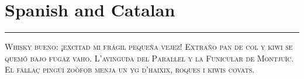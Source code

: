 

\vspace{-1em}\section*{\checkyes Spanish and Catalan}
\vspace{-.5em}\hrule\vspace{.5em}
\noindent\textsc{
Whisky bueno: ¡excitad mi frágil pequeña vejez!
Extraño pan de col y kiwi se quemó bajo fugaz vaho. 
L'avinguda del Paraŀlel y la Funicular de Montjuïc.
El faŀlaç pingüí zoòfob menja un yg d'haixix, roques i kiwis covats.
}